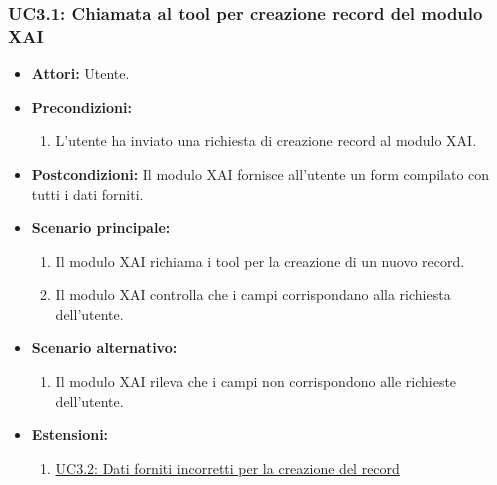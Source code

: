 \subsubsection{UC3.1: Chiamata al tool per creazione record del modulo XAI}
    \label{uc:uc3.1}
    \begin{itemize}
        \item \textbf{Attori:} Utente.
        \item \textbf{Precondizioni:}
            \begin{enumerate}
                \item L'utente ha inviato una richiesta di creazione record al modulo XAI.
            \end{enumerate}
        \item \textbf{Postcondizioni:} Il modulo XAI fornisce all'utente un form compilato con tutti i dati forniti.
        \item \textbf{Scenario principale:}
            \begin{enumerate}
                \item Il modulo XAI richiama i tool per la creazione di un nuovo record.
                \item Il modulo XAI controlla che i campi corrispondano alla richiesta dell'utente.
            \end{enumerate}
        \item \textbf{Scenario alternativo:}
            \begin{enumerate}
                \item Il modulo XAI rileva che i campi non corrispondono alle richieste dell'utente.
            \end{enumerate}
        \item \textbf{Estensioni:}
            \begin{enumerate}
                \item \hyperref[uc:uc3.2]{UC3.2: Dati forniti incorretti per la creazione del record}
            \end{enumerate}
    \end{itemize}

